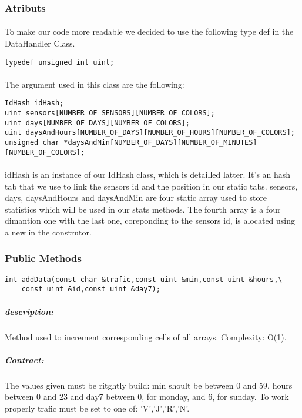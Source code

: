 \documentclass[a4paper, 12pts]{article}
\begin{document}
\subsubsection{Atributs}
\paragraph{}
	To make our code more readable we decided to use the following type def in the DataHandler Class.
\begin{lstlisting}
typedef unsigned int uint;
\end{lstlisting}

\paragraph{}
	The argument used in this class are the following:
\begin{lstlisting}
IdHash idHash;
uint sensors[NUMBER_OF_SENSORS][NUMBER_OF_COLORS];
uint days[NUMBER_OF_DAYS][NUMBER_OF_COLORS];
uint daysAndHours[NUMBER_OF_DAYS][NUMBER_OF_HOURS][NUMBER_OF_COLORS];
unsigned char *daysAndMin[NUMBER_OF_DAYS][NUMBER_OF_MINUTES][NUMBER_OF_COLORS];
\end{lstlisting}

\paragraph{}
	idHash is an instance of our IdHash class, which is detailled latter. It's an hash tab that we use to link the sensors id and the position in our static tabs.
	sensors, days, daysAndHours and daysAndMin are four static array used to store statistics which will be used in our stats methods. The fourth array is a four dimantion one with the last one, coreponding to the sensors id, is alocated using a new in the construtor.

\subsubsection{Public Methods}

\begin{lstlisting}
int addData(const char &trafic,const uint &min,const uint &hours,\
	const uint &id,const uint &day7);
\end{lstlisting}
\subparagraph{description:}
	Method used to increment corresponding cells of all arrays. Complexity: O(1).
\subparagraph{Contract:}
	The values given must be ritghtly build: min shoult be between 0 and 59, hours between 0 and 23 and day7 between 0, for monday, and 6, for sunday. To work properly trafic must be set to one of: 'V','J','R','N'.
\end{document}

